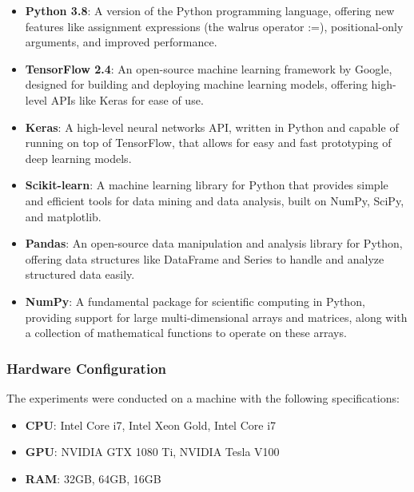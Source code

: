 \begin{itemize}
    \item \textbf{Python 3.8}: A version of the Python programming language, offering new features like assignment expressions (the walrus operator :=), positional-only arguments, and improved performance.
    
    \item \textbf{TensorFlow 2.4}: An open-source machine learning framework by Google, designed for building and deploying machine learning models, offering high-level APIs like Keras for ease of use.
    
    \item \textbf{Keras}: A high-level neural networks API, written in Python and capable of running on top of TensorFlow, that allows for easy and fast prototyping of deep learning models.
    
    \item \textbf{Scikit-learn}: A machine learning library for Python that provides simple and efficient tools for data mining and data analysis, built on NumPy, SciPy, and matplotlib.
    
    \item \textbf{Pandas}: An open-source data manipulation and analysis library for Python, offering data structures like DataFrame and Series to handle and analyze structured data easily.
    
    \item \textbf{NumPy}: A fundamental package for scientific computing in Python, providing support for large multi-dimensional arrays and matrices, along with a collection of mathematical functions to operate on these arrays.
    
\end{itemize}

\subsubsection{Hardware Configuration}

The experiments were conducted on a machine with the following specifications:

\begin{itemize}

\item \textbf{CPU}: Intel Core i7,  Intel Xeon Gold, Intel Core i7

\item \textbf{GPU}: NVIDIA GTX 1080 Ti, NVIDIA Tesla V100

\item \textbf{RAM}: 32GB, 64GB, 16GB

\end{itemize}

